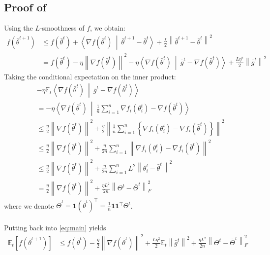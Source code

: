\documentclass[10pt]{article} %
\theoremstyle{plain}
\theoremstyle{definition}
\theoremstyle{remark}
\newcommand{\prm}{\theta}
\newcommand{\avgg}{\bar{g}}
\newcommand{\avgtheta}{\bar{\prm}}
\newcommand{\dotp}[2]{\left\langle{#1}\ \middle|\ {#2}\right\rangle}
\newcommand{\norm}[1]{\left\| #1 \right\|}
\newcommand{\avgone}{\frac{1}{n}\mathbf{1}\mathbf{1}^\top}
\begin{document}
\subsection{Proof of } \label{app:pf_onestep}
Using the $L$-smoothness of $f$, we obtain:
\begin{align}
    f(\bar{\theta}^{t+1}) &\le f(\bar{\theta}^t) + \dotp{\nabla f(\bar{\theta}^t)}{\bar{\theta}^{t+1} - \bar{\theta}^t} + \frac{L}{2} \norm{\avgtheta^{t+1} - \avgtheta^t}^2 \nonumber\\
    &= f(\avgtheta^t) - \eta  \norm{\nabla f(\avgtheta^t)}^2 - \eta \dotp{\nabla f(\avgtheta^t)}{\avgg^t -  \nabla f(\avgtheta^t)} + \frac{L\eta^2}{2} \norm{\avgg^t}^2 \label{eq:main}
\end{align}
Taking the conditional expectation on the inner product:
\begin{align*}
    &-\eta \mathbb{E}_t\dotp{\nabla f(\avgtheta^t)}{\avgg^t -  \nabla f(\avgtheta^t)} \\
    &= -\eta \dotp{\nabla f(\avgtheta^t)}{\frac{1}{n} \sum^n_{i=1}  \nabla f_i(\theta^t_i)  -  \nabla f(\avgtheta^t)} \\
    &\leq \frac{\eta }{2}\norm{\nabla f(\avgtheta^t)}^2 + \frac{\eta }{2 } \norm{\frac{1}{n} \sum^n_{i=1}\left\{  \nabla f_i(\theta^t_i) - \nabla f_i(\avgtheta^t)\right\}}^2 \\
    &\leq \frac{\eta }{2}\norm{\nabla f(\avgtheta^t)}^2 + \frac{\eta }{2n}
            \sum^n_{i=1}\norm{\nabla f_i(\theta^t_i) - \nabla f_i(\avgtheta^t)}^2  \\
    &\leq \frac{\eta }{2}\norm{\nabla f(\avgtheta^t)}^2 + \frac{\eta }{2n}
            \sum^n_{i=1}L^2\norm{\theta^t_i - \avgtheta^t}^2  \\
    &=\frac{\eta }{2}\norm{\nabla f(\avgtheta^t)}^2 + \frac{\eta  L^2}{2n} \norm{\Theta^t - \bar{\Theta}^t}_F^2
\end{align*}
where we denote $\bar{\Theta}^t = \mathbf{1} (\avgtheta^t)^\top = \avgone \Theta^t$. \\ \\
Putting back into \eqref{eq:main} yields
\begin{align}
    \mathbb{E}_t [f(\avgtheta^{t+1})] &\leq f(\avgtheta^t) - \frac{\eta }{2}\norm{\nabla f(\avgtheta^t)}^2 + \frac{L\eta^2}{2}\mathbb{E}_t\norm{\avgg^t}^2 + \frac{\eta  L^2}{2n} \norm{\Theta^t - \bar{\Theta}^t}_F^2 \label{eq:main2}
\end{align}
\end{document}
